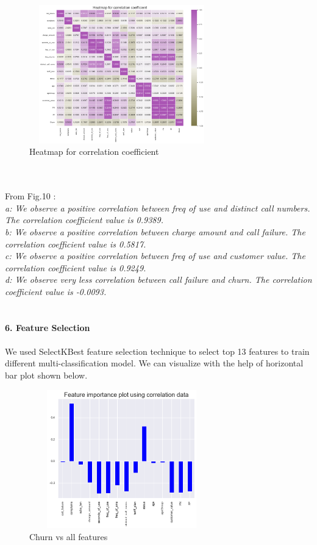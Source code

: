 \documentclass[a4paper, 10pt, conference]{ieeeconf}      %
\begin{document}
\begin{figure}[htp]
    \centering
    \includegraphics[width=8cm,height=6cm]{Images/heatmap.png}
    \caption{Heatmap for correlation coefficient}
    \label{fig:heatmap}
\end{figure}
\\\
\\From Fig.10 :
\\\textit{a: We observe a  positive correlation between freq of use and distinct call numbers. The correlation coefficient value is 0.9389.
\\b: We observe a  positive correlation between charge amount and call failure. The correlation coefficient value is 0.5817.
\\c: We observe a  positive correlation between freq of use and customer value. The correlation coefficient value is 0.9249.
\\d: We observe very less correlation between call failure and churn. The correlation coefficient value is -0.0093.}
\\\
\\\
\\\textbf{6. Feature Selection}
\\
\\We used SelectKBest feature selection technique to select top 13 features to train different multi-classification model. We can visualize with the help of horizontal bar plot shown below.
\begin{figure}[htp]
    \centering
    \includegraphics[width=8cm,height=6cm]{Images/featureImportance.png}
    \caption{Churn vs all features}
    \label{fig:featureImportance}
\end{figure}
\end{document}

